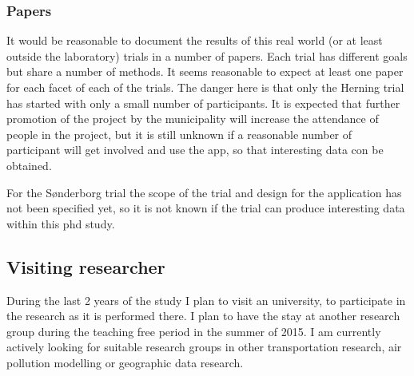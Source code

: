 \subsubsection{Papers}
It would be reasonable to document the results of this real world (or at least outside the laboratory) trials in a number of papers. Each trial has different goals but share a number of methods. It seems reasonable to expect at least one paper for each facet of each of the trials. The danger here is that only the Herning trial has started with only a small number of participants. It is expected that further promotion of the project by the municipality will increase the attendance of people in the project, but it is still unknown if a reasonable number of participant will get involved and use the app, so that interesting data con be obtained.

For the S\o nderborg trial the scope of the trial and design for the application has not been specified yet, so it is not known if the trial can produce interesting data within this phd study.


\subsection{Visiting researcher}
During the last 2 years of the study I plan to visit an university, to participate in the research as it is performed there. I plan to have the stay at another research group during the teaching free period in the summer of 2015. I am currently actively looking for suitable research groups in other transportation research, air pollution modelling or geographic data research.
